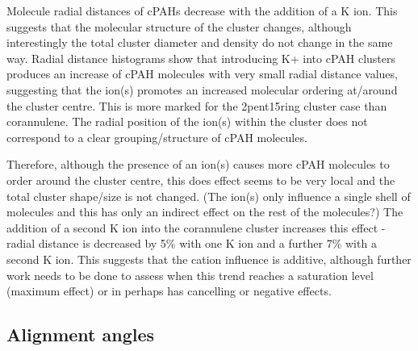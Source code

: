 Molecule radial distances of cPAHs decrease %
with the addition of a K ion. This suggests that the molecular structure of the cluster changes, although interestingly the total cluster diameter and density do not change in the same way. Radial distance histograms show that introducing K+ into cPAH clusters produces an increase of cPAH molecules with very small radial distance values, suggesting that the ion(s) promotes an increased molecular ordering at/around the cluster centre. This is more marked for the 2pent15ring cluster case than corannulene. 
The radial position of the ion(s) within the cluster does not correspond to a clear grouping/structure of cPAH molecules. %

Therefore, although the presence of an ion(s) causes more cPAH molecules to order around the cluster centre, this does effect seems to be very local and the total cluster shape/size is not changed.  (The ion(s) only influence a single shell of molecules and this has only an indirect effect on the rest of the molecules?)
The addition of a second K ion into the corannulene cluster increases this effect - radial distance is decreased by 5\% with one K ion and a further 7\% with a second K ion. This suggests that the cation influence is additive, although further work needs to be done to assess when this trend reaches a saturation level (maximum effect) or in perhaps has cancelling or negative effects.


\subsection{Alignment angles}

